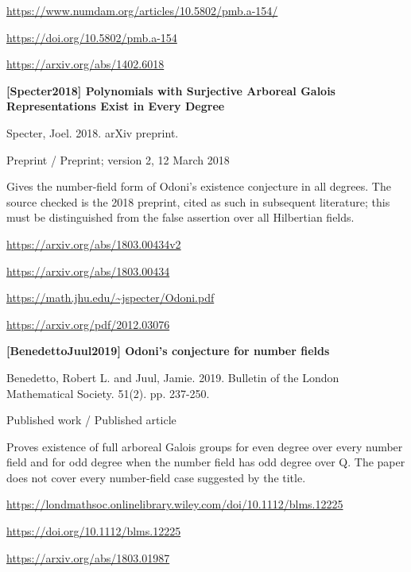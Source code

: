 \documentclass[11pt,a4paper,oneside,openany]{book}
\begin{document}
{\footnotesize\url{https://www.numdam.org/articles/10.5802/pmb.a-154/}}\par
{\footnotesize\url{https://doi.org/10.5802/pmb.a-154}}\par
{\footnotesize\url{https://arxiv.org/abs/1402.6018}}\par
\vspace{9pt}
\hypertarget{ref:Specter2018}{}
{\sffamily\bfseries\color{atlasgreen}[Specter2018] Polynomials with Surjective Arboreal Galois Representations Exist in Every Degree}\par
\color{black} Specter, Joel. 2018. arXiv preprint.\par
{\small\sffamily\color{atlasgold}Preprint / Preprint; version 2, 12 March 2018}\par
\color{black} Gives the number-field form of Odoni's existence conjecture in all degrees. The source checked is the 2018 preprint, cited as such in subsequent literature; this must be distinguished from the false assertion over all Hilbertian fields.\par
{\footnotesize\url{https://arxiv.org/abs/1803.00434v2}}\par
{\footnotesize\url{https://arxiv.org/abs/1803.00434}}\par
{\footnotesize\url{https://math.jhu.edu/~jspecter/Odoni.pdf}}\par
{\footnotesize\url{https://arxiv.org/pdf/2012.03076}}\par
\vspace{9pt}
\hypertarget{ref:BenedettoJuul2019}{}
{\sffamily\bfseries\color{atlasgreen}[BenedettoJuul2019] Odoni's conjecture for number fields}\par
\color{black} Benedetto, Robert L. and Juul, Jamie. 2019. Bulletin of the London Mathematical Society. 51(2). pp. 237-250.\par
{\small\sffamily\color{atlasgold}Published work / Published article}\par
\color{black} Proves existence of full arboreal Galois groups for even degree over every number field and for odd degree when the number field has odd degree over Q. The paper does not cover every number-field case suggested by the title.\par
{\footnotesize\url{https://londmathsoc.onlinelibrary.wiley.com/doi/10.1112/blms.12225}}\par
{\footnotesize\url{https://doi.org/10.1112/blms.12225}}\par
{\footnotesize\url{https://arxiv.org/abs/1803.01987}}\par
\end{document}
